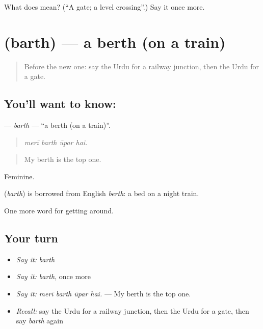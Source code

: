 \begin{tcolorbox}[breakable,colback=teal!4,colframe=teal!35!black,title={Before you move on}]
What does  mean? (\textquotedblleft{}A gate; a level crossing\textquotedblright{}.) Say it once more.
\end{tcolorbox}
\section[\texorpdfstring{\ur{برتھ} (barth)}{برتھ (barth)}]{ (barth) — a berth (on a train)}

\label{lesson:UR-C388-barth}



\begin{quote}
Before the new one: say the Urdu for a railway junction, then the Urdu for a gate.
\end{quote}

\subsection*{You'll want to know: }
\textbf{} — \emph{barth} — \textquotedblleft{}a berth (on a train)\textquotedblright{}.

\begin{quote}
   
\end{quote}

\begin{quote}
\emph{merī barth ūpar hai.}
\end{quote}

\begin{quote}
My berth is the top one.
\end{quote}

Feminine.

\begin{cousinweb}
\textbf{} (\emph{barth}) is borrowed from English \emph{berth}: a bed on a night train.
\end{cousinweb}

\begin{grammarlens}[title={What you've built}]
One more word for getting around.
\end{grammarlens}

\subsection*{Your turn}
\begin{itemize}
\raggedright
  \item \emph{Say it:} \emph{barth}
  \item \emph{Say it:} \emph{barth}, once more
  \item \emph{Say it:} \emph{merī barth ūpar hai.} — My berth is the top one.
  \item \emph{Recall:} say the Urdu for a railway junction, then the Urdu for a gate, then say \emph{barth} again
\end{itemize}

